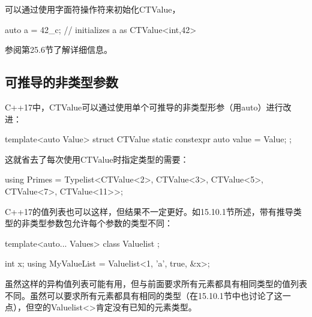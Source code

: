 可以通过使用字面符操作符来初始化CTValue，

\begin{cpp}
auto a = 42_c; // initializes a as CTValue<int,42>
\end{cpp}

参阅第25.6节了解详细信息。

\subsection{可推导的非类型参数}

C++17中，CTValue可以通过使用单个可推导的非类型形参（用auto）进行改进：

\begin{cpp}
template<auto Value>
struct CTValue
{
	static constexpr auto value = Value;
};
\end{cpp}

这就省去了每次使用CTValue时指定类型的需要：

\begin{cpp}
using Primes = Typelist<CTValue<2>, CTValue<3>, CTValue<5>,
						CTValue<7>, CTValue<11>>;
\end{cpp}

C++17的值列表也可以这样，但结果不一定更好。如15.10.1节所述，带有推导类型的非类型参数包允许每个参数的类型不同：

\begin{cpp}
template<auto... Values>
class Valuelist { };

int x;
using MyValueList = Valuelist<1, 'a', true, &x>;
\end{cpp}

虽然这样的异构值列表可能有用，但与前面要求所有元素都具有相同类型的值列表不同。虽然可以要求所有元素都具有相同的类型（在15.10.1节中也讨论了这一点），但空的Valuelist<>肯定没有已知的元素类型。













